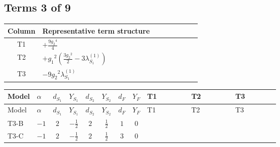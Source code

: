\documentclass[8pt]{article}
\begin{document}
\begin{landscape}
\subsection*{Terms 3 of 9}
\begin{center}
\begin{tabular}{@{}c >{\raggedright\arraybackslash}p{0.82\linewidth}@{}}
\toprule
Column & Representative term structure \\
\midrule
T1 & \(\displaystyle +\frac{9 {g_2}^4}{4}\) \\
\midrule
T2 & \(\displaystyle +{g_1}^2 \left(\frac{3 {g_2}^2}{2}-3 {\lambda_{S_1}^{(1)}}\right)\) \\
\midrule
T3 & \(\displaystyle -9 {g_2}^2 {\lambda_{S_1}^{(1)}}\) \\
\midrule
\bottomrule
\end{tabular}
\end{center}
\smallskip
\tiny
\begin{longtable}{@{}llcccccc >{\raggedright\arraybackslash}p{0.21\linewidth} >{\raggedright\arraybackslash}p{0.21\linewidth} >{\raggedright\arraybackslash}p{0.21\linewidth}@{}}
\toprule
Model & $\alpha$ & $d_{S_1}$ & $Y_{S_1}$ & $d_{S_2}$ & $Y_{S_2}$ & $d_F$ & $Y_F$ & T1 & T2 & T3 \\
\midrule
\endfirsthead
\toprule
Model & $\alpha$ & $d_{S_1}$ & $Y_{S_1}$ & $d_{S_2}$ & $Y_{S_2}$ & $d_F$ & $Y_F$ & T1 & T2 & T3 \\
\midrule
\endhead
T3-B & $-1$ & $2$ & $-\frac{1}{2}$ & $2$ & $\frac{1}{2}$ & $1$ & $0$ & \scriptsize\adjustbox{max width=\linewidth}{$\begin{gathered} +\frac{9 {g_2}^4}{4}\end{gathered}$} & \scriptsize\adjustbox{max width=\linewidth}{$\begin{gathered} +{g_1}^2 \left(\frac{3 {g_2}^2}{2}-3 {\lambda_{S_1}^{(1)}}\right)\end{gathered}$} & \scriptsize\adjustbox{max width=\linewidth}{$\begin{gathered} -9 {g_2}^2 {\lambda_{S_1}^{(1)}}\end{gathered}$} \\
\midrule
T3-C & $-1$ & $2$ & $-\frac{1}{2}$ & $2$ & $\frac{1}{2}$ & $3$ & $0$ & \scriptsize\adjustbox{max width=\linewidth}{$\begin{gathered} +\frac{9 {g_2}^4}{4}\end{gathered}$} & \scriptsize\adjustbox{max width=\linewidth}{$\begin{gathered} +{g_1}^2 \left(\frac{3 {g_2}^2}{2}-3 {\lambda_{S_1}^{(1)}}\right)\end{gathered}$} & \scriptsize\adjustbox{max width=\linewidth}{$\begin{gathered} -9 {g_2}^2 {\lambda_{S_1}^{(1)}}\end{gathered}$} \\

\end{longtable}
\end{landscape}
\end{document}
